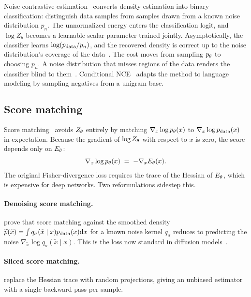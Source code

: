 Noise-contrastive estimation~\citep{gutmann2010noise,gutmann2012noise} converts density estimation into binary classification: distinguish data samples from samples drawn from a known noise distribution $p_n$.
The unnormalized energy enters the classification logit, and $\log Z_\theta$ becomes a learnable scalar parameter trained jointly.
Asymptotically, the classifier learns $\log(p_{\mathrm{data}} / p_n)$, and the recovered density is correct up to the noise distribution's coverage of the data~\citep{ma2018noise}.
The cost moves from sampling $p_\theta$ to choosing $p_n$.
A noise distribution that misses regions of the data renders the classifier blind to them~\citep{gutmann2014likelihood}.
Conditional NCE~\citep{mnih2012fast} adapts the method to language modeling by sampling negatives from a unigram base.

\subsection{Score matching}
\label{ssec:score_matching}

Score matching~\citep{hyvarinen2005score} avoids $Z_\theta$ entirely by matching $\nabla_x \log p_\theta(x)$ to $\nabla_x \log p_{\mathrm{data}}(x)$ in expectation.
Because the gradient of $\log Z_\theta$ with respect to $x$ is zero, the score depends only on $E_\theta$:
\begin{equation}
  \nabla_x \log p_\theta(x) \;=\; -\nabla_x E_\theta(x).
\end{equation}
The original Fisher-divergence loss requires the trace of the Hessian of $E_\theta$, which is expensive for deep networks.
Two reformulations sidestep this.
\paragraph{Denoising score matching.}
\citet{vincent2011connection} prove that score matching against the smoothed density $\widetilde{p}(\tilde{x}) = \int q_\sigma(\tilde{x} \mid x) p_{\mathrm{data}}(x) \mathrm{d}x$ for a known noise kernel $q_\sigma$ reduces to predicting the noise $\nabla_{\tilde{x}} \log q_\sigma(\tilde{x} \mid x)$.
This is the loss now standard in diffusion models~\citep{song2019generative,ho2020denoising}.
\paragraph{Sliced score matching.}
\citet{song2020sliced} replace the Hessian trace with random projections, giving an unbiased estimator with a single backward pass per sample.

